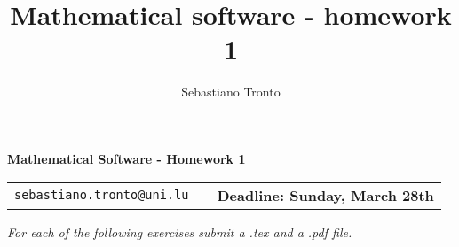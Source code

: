 \documentclass[12pt,a4paper]{article}
\title{Mathematical software - homework 1}
\author{Sebastiano Tronto}
\theoremstyle{definition}
\theoremstyle{definition}
\begin{document}
\noindent\hrulefill

\begin{center}
\Huge{\textbf{Mathematical Software - Homework 1}}
\end{center}

\noindent\hrulefill
\begin{center}
\begin{tabular}{lcr}
\texttt{sebastiano.tronto@uni.lu} & \qquad \qquad \qquad \qquad &
\textbf{Deadline: Sunday, March 28th}
\end{tabular}
\end{center}

\vspace{1cm}

\begin{center}
  \emph{\large
    For each of the following exercises submit a .tex and a .pdf file.
  }
\end{center}

\vspace{1cm}
\end{document}
